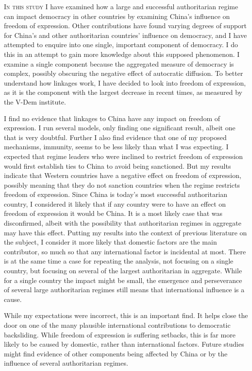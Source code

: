 \lettrine{I}{n this study} I have examined how a large and successful authoritarian regime can impact democracy in other countries by examining China's influence on freedom of expression. Other contributions have found varying degrees of support for China's and other authoritarian countries' influence on democracy, and I have attempted to enquire into one single, important component of democracy. I do this in an attempt to gain more knowledge about this supposed phenomenon. I examine a single component because the aggregated measure of democracy is complex, possibly obscuring the negative effect of autocratic diffusion. To better understand how linkages work, I have decided to look into freedom of expression, as it is the component with the largest decrease in recent times, as measured by the V-Dem institute.

I find no evidence that linkages to China have any impact on freedom of expression. I run several models, only finding one significant result, albeit one that is very doubtful. Further I also find evidence that one of my proposed mechanisms, immunity, seems to be less likely than what I was expecting. I expected that regime leaders who were inclined to restrict freedom of expression would first establish ties to China to avoid being sanctioned. But my results indicate that Western countries have a negative effect on freedom of expression, possibly meaning that they do not sanction countries when the regime restricts freedom of expression. Since China is today's most successful authoritarian country, I considered it likely that if any country were to have an effect on freedom of expression it would be China. It is a most likely case that was disconfirmed, albeit with the possibility that authoritarian regimes in aggregate may have this effect. Putting my results into the context of previous literature on the subject, I consider it more likely that domestic factors are the main contributor, so much so that any international factor is incidental at most. There is at the same time a case for repeating the analysis, not focusing on a single country, but focusing on several of the largest authoritarian in aggregate. While for a single country the impact might be small, the emergence and perseverance of several large authoritarian regimes still means that international influence is a cause.

While my expectations were incorrect, this is an important find. It helps close the door on one of the many plausible international contributions to democratic backsliding. While freedom of expression is suffering setbacks, this is far more likely to be caused by domestic, rather than international factors. Future studies might find evidence of other components being affected by China or by the influence of several authoritarian regimes. 

